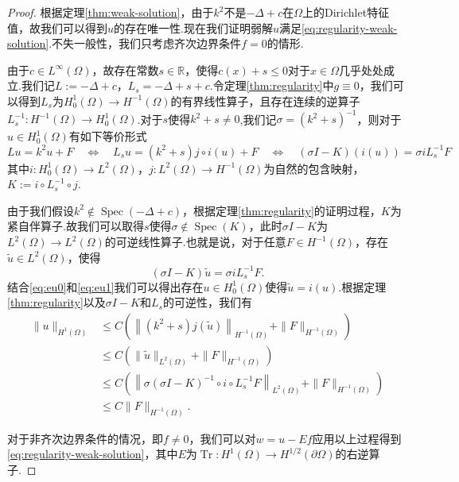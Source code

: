 \begin{proof}
根据定理\ref{thm:weak-solution}，由于$k^2$不是$-\Delta+c$在$\Omega$上的Dirichlet特征值，故我们可以得到$u$的存在唯一性.现在我们证明弱解$u$满足\eqref{eq:regularity-weak-solution}.不失一般性，我们只考虑齐次边界条件$f=0$的情形.

由于$c\in L^{\infty}(\Omega)$，故存在常数$s\in\mathbb{R}$，使得$c(x)+s\leq 0$对于$x\in\Omega$几乎处处成立.我们记$L:=-\Delta +c$，$L_{s}=-\Delta +s +c$.令定理\ref{thm:regularity}中$g\equiv 0$，我们可以得到$L_{s}$为$H_{0}^1(\Omega)\rightarrow H^{-1}(\Omega)$的有界线性算子，且存在连续的逆算子$L_{s}^{-1}:H^{-1}(\Omega)\rightarrow H^{1}_0(\Omega)$.对于$s$使得$k^2+s\ne 0$,我们记$\sigma=(k^2+s)^{-1}$，则对于$u\in H^{1}_0(\Omega)$有如下等价形式
\begin{equation}\label{eq:eu0}
Lu=k^2 u +F \quad \Leftrightarrow \quad L_{s} u = (k^2+s)j\circ i(u) + F
\quad \Leftrightarrow \quad (\sigma I-K)(i(u)) = \sigma i L_s^{-1}F
\end{equation}
其中$i: H^{1}_0(\Omega)\rightarrow L^2(\Omega)$，$j:L^2(\Omega)\rightarrow H^{-1}(\Omega)$为自然的包含映射，$K:=i\circ L_s^{-1} \circ j$.

由于我们假设$k^2\notin\operatorname{Spec}(-\Delta+c)$，根据定理\ref{thm:regularity}的证明过程，$K$为紧自伴算子{}.故我们可以取得$s$使得$\sigma\notin\operatorname{Spec}(K)$，此时$\sigma I-K$为$L^2(\Omega)\rightarrow L^2(\Omega)$的可逆线性算子.也就是说，对于任意$F\in H^{-1}(\Omega)$，存在$\tilde{u}\in L^2(\Omega)$，使得
\begin{equation}\label{eq:eu1}
(\sigma I-K)\tilde{u} = \sigma i L_s^{-1}F.
\end{equation}
结合\eqref{eq:eu0}和\eqref{eq:eu1}我们可以得出存在$u\in H^{1}_0(\Omega)$使得$\tilde{u}=i(u)$.根据定理\ref{thm:regularity}以及$\sigma I-K$和$L_{s}$的可逆性，我们有
\begin{equation*}
\begin{aligned}
\|u\|_{H^1(\Omega)} &\leq C\left( \left\|(k^2+s) j(\tilde{u})\right\|_{H^{-1}(\Omega)} + \|F\|_{H^{-1}(\Omega)} \right)\\
&\leq C\left( \|\tilde{u}\|_{L^2(\Omega)} + \|F\|_{H^{-1}(\Omega)} \right)\\
& \leq C\left( \left\|\sigma(\sigma I-K)^{-1}\circ i\circ L^{-1}_s F\right\|_{L^2(\Omega)} + \|F\|_{H^{-1}(\Omega)} \right)\\
& \leq C\|F\|_{H^{-1}(\Omega)}.
\end{aligned}
\end{equation*}

对于非齐次边界条件的情况，即$f\ne 0$，我们可以对$w=u-Ef$应用以上过程得到\eqref{eq:regularity-weak-solution}，其中$E$为$\operatorname{Tr}:H^{1}(\Omega)\rightarrow H^{1/2}(\partial\Omega)$的右逆算子.
\end{proof}
